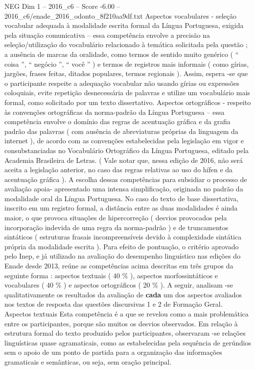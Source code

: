 \begin{textsample}{NEG Dim 1 – 2016\_c6 – Score -6.00 – 2016\_c6/enade\_2016\_odonto\_8f210aa9df.txt}
Aspectos vocabulares - seleção vocabular adequada à modalidade escrita formal da Língua Portuguesa, exigida pela situação comunicativa – essa competência envolve a precisão na seleção/utilização do vocabulário relacionado à temática solicitada pela questão ; a ausência de marcas da oralidade, como termos de sentido muito genérico ( “ coisa ”, “ negócio ”, “ você ” ) e termos de registros mais informais ( como gírias, jargões, frases feitas, ditados populares, termos regionais ).
Assim, espera -se que o participante respeite a adequação vocabular não usando gírias ou expressões coloquiais, evite repetição desnecessária de palavras e utilize um vocabulário mais formal, como solicitado por um texto dissertativo.
Aspectos ortográficos - respeito às convenções ortográficas da norma-padrão da Língua Portuguesa – essa competência envolve o domínio das regras de acentuação gráfica e da grafia padrão das palavras ( com ausência de abreviaturas próprias da linguagem da internet ), de acordo com as convenções estabelecidas pela legislação em vigor e consubstanciadas no Vocabulário Ortográfico da Língua Portuguesa, editado pela Academia Brasileira de Letras. ( Vale notar que, nessa edição de 2016, não será aceita a legislação anterior, no caso das regras relativas ao uso do hífen e da acentuação gráfica ).
A escolha dessas competências para subsidiar o processo de avaliação apoia- apresentado uma intensa simplificação, originada no padrão da modalidade oral da Língua Portuguesa.
No caso do texto de base dissertativa, inscrito em um registro formal, a distância entre as duas modalidades é ainda maior, o que provoca situações de hipercorreção ( desvios provocados pela incorporação indevida de uma regra da norma-padrão ) e de truncamentos sintáticos ( estruturas frasais incompreensíveis devido à complexidade sintática própria da modalidade escrita ).
Para efeito de pontuação, o critério aprovado pelo Inep, e já utilizado na avaliação do desempenho linguístico nas edições do Enade desde 2013, reúne as competências acima descritas em três grupos da seguinte forma : aspectos textuais ( 40 \% ), aspectos morfossintáticos e vocabulares ( 40 \% ) e aspectos ortográficos ( 20 \% ).
A seguir, analisam -se qualitativamente os resultados da avaliação de \textbf{cada} um dos aspectos avaliados nos textos de resposta das questões discursivas 1 e 2 de Formação Geral.
Aspectos textuais Esta competência é a que se revelou como a mais problemática entre os participantes, porque são muitos os desvios observados.
Em relação à estrutura formal do texto produzido pelos participantes, observaram -se relações linguísticas quase agramaticais, como as estabelecidas pela sequência de gerúndios sem o apoio de um ponto de partida para a organização das informações gramaticais e semânticas, ou seja, sem oração principal.

\end{textsample}
